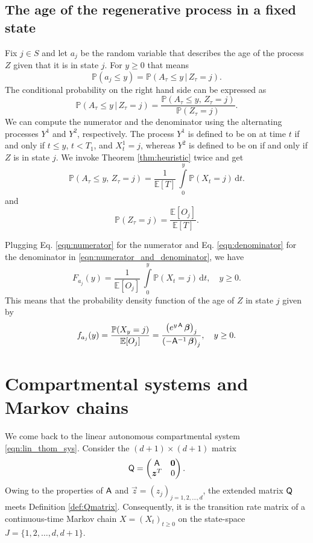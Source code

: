 \documentclass[smallextended]{svjour3}
\renewcommand{\P}{\mathbb{P}}
\newcommand{\E}{\mathbb{E}}
\newcommand{\intl}{\int\limits}
\begin{document}
\subsection{The age of the regenerative process in a fixed state\label{sec:compartmentage}}

Fix $j\in S$ and let $a_j$ be the random variable that describes the age of the process $Z$ given that it is in state $j$.
For $y\geq0$ that means
\[
    \P(a_j\leq y) = \P(A_\tau\leq y\,|\,Z_\tau=j).
\]
The conditional probability on the right hand side can be expressed as
\begin{equation}\label{eqn:numerator_and_denominator}
    \P(A_\tau\leq y\,|\,Z_\tau=j) = \frac{\P(A_\tau\leq y,\,Z_\tau=j)}{\P(Z_\tau=j)}.
\end{equation}
We can compute the numerator and the denominator using the alternating processes $Y^1$ and $Y^2$, respectively.
The process $Y^1$ is defined to be on at time $t$ if and only if $t\leq y$, $t<T_1$, and $X^1_t=j$, whereas $Y^2$ is defined to be on if and only if $Z$ is in state $j$.
We invoke Theorem \ref{thm:heuristic} twice and get
\begin{equation}\label{eqn:numerator}
    \P(A_\tau\leq y,\,Z_\tau=j) = \frac{1}{\E[T]}\,\intl_0^y\P(X_t=j)\,\mathrm{d}t.
\end{equation}
and
\begin{equation}\label{eqn:denominator}
    \P(Z_\tau=j) = \frac{\E[O_j]}{\E[T]}.
\end{equation}

Plugging Eq. \eqref{eqn:numerator} for the numerator and Eq. \eqref{eqn:denominator} for the denominator in \eqref{eqn:numerator_and_denominator}, we have
\[
    F_{a_j}(y) = \frac{1}{\E[O_j]}\,\intl_0^y\P(X_t=j)\,\mathrm{d}t,\quad y\geq0.
\]
This means that the probability density function of the age of $Z$ in state $j$ given by
\begin{equation}\label{eqn:dens_aj}
    f_{a_j}(y) = \frac{\P(X_y=j)}{\E[O_j]} = \frac{\left(e^{y\,\tens{A}}\,\vec{\beta}\right)_j}{\left(-\tens{A}^{-1}\,\vec{\beta}\right)_j},\quad y\geq0.
\end{equation}

\section{Compartmental systems and Markov chains\label{sec:systems}}

We come back to the linear autonomous compartmental system \eqref{eqn:lin_thom_sys}. Consider the $(d+1)\times(d+1)$ matrix
\[
    \tens{Q} = \begin{pmatrix} \tens{A} & \vec{0} \\ \vec{z}^T & 0\end{pmatrix}.
\]
Owing to the properties of $\mathsf{A}$ and $\vec{z}=(z_j)_{j=1,2,\ldots,d}$, the extended matrix $\mathsf{Q}$ meets Definition \ref{def:Qmatrix}.
Consequently, it is the transition rate matrix of a continuous-time Markov chain $X=(X_t)_{t\geq0}$ on the state-space \\
$J=\{1,2,\ldots,d,d+1\}$.
\end{document}
